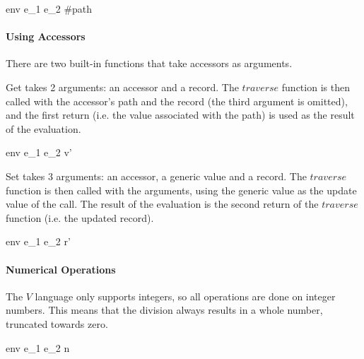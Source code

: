 \documentclass{article}
\begin{document}
    {\mbox{env} \vdash e_1 \; e_2 \Downarrow \#path \; [v_1, \; v_2]}

\paragraph{Using Accessors}

There are two built-in functions that take accessors as arguments.


Get takes 2 arguments: an accessor and a record.
The $traverse$ function is then called with the accessor's path and the record (the third argument is omitted), and the first return (i.e. the value associated with the path) is used as the result of the evaluation.

    {\mbox{env} \vdash e_1 \; e_2 \Downarrow v'}

Set takes 3 arguments: an accessor, a generic value and a record.
The $traverse$ function is then called with the arguments, using the generic value as the update value of the call.
The result of the evaluation is the second return of the $traverse$ function (i.e. the updated record).

    {\mbox{env} \vdash e_1 \; e_2 \Downarrow r'}


\paragraph{Numerical Operations}
The $V$ language only supports integers, so all operations are done on integer numbers.
This means that the division always results in a whole number, truncated towards zero.

\medskip

    {\mbox{env} \vdash e_1 \; e_2 \Downarrow n}
\end{document}
